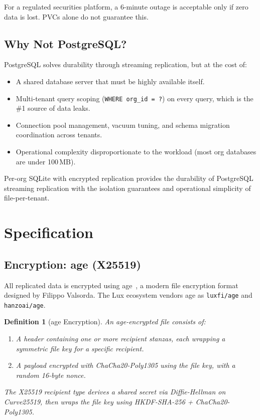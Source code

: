\documentclass[11pt,a4paper]{article}
\newtheorem{definition}{Definition}[section]
\begin{document}
For a regulated securities platform, a 6-minute outage is acceptable
only if zero data is lost. PVCs alone do not guarantee this.

\subsection{Why Not PostgreSQL?}

PostgreSQL solves durability through streaming replication, but at the
cost of:

\begin{itemize}[nosep]
  \item A shared database server that must be highly available itself.
  \item Multi-tenant query scoping (\texttt{WHERE org\_id = ?}) on
    every query, which is the \#1 source of data leaks.
  \item Connection pool management, vacuum tuning, and schema migration
    coordination across tenants.
  \item Operational complexity disproportionate to the workload (most
    org databases are under 100\,MB).
\end{itemize}

Per-org SQLite with encrypted replication provides the durability of
PostgreSQL streaming replication with the isolation guarantees and
operational simplicity of file-per-tenant.

\section{Specification}\label{sec:spec}

\subsection{Encryption: age (X25519)}\label{sec:age}

All replicated data is encrypted using age~\cite{age}, a modern
file encryption format designed by Filippo Valsorda. The Lux
ecosystem vendors age as \texttt{luxfi/age} and \texttt{hanzoai/age}.

\begin{definition}[age Encryption]\label{def:age}
An age-encrypted file consists of:
\begin{enumerate}[nosep]
  \item A header containing one or more recipient stanzas, each
    wrapping a symmetric file key for a specific recipient.
  \item A payload encrypted with ChaCha20-Poly1305 using the file
    key, with a random 16-byte nonce.
\end{enumerate}
The X25519 recipient type derives a shared secret via Diffie-Hellman
on Curve25519, then wraps the file key using HKDF-SHA-256 +
ChaCha20-Poly1305.
\end{definition}
\end{document}
